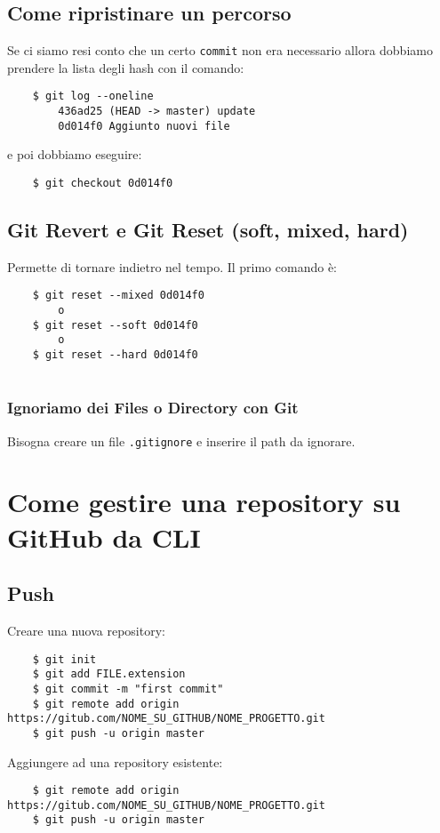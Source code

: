 \documentclass{article}
\begin{document}
\subsection*{Come ripristinare un percorso}
Se ci siamo resi conto che un certo \texttt{commit} non era necessario allora dobbiamo prendere la lista degli hash con il comando:
\begin{verbatim}
    $ git log --oneline
        436ad25 (HEAD -> master) update
        0d014f0 Aggiunto nuovi file
\end{verbatim}
e poi dobbiamo eseguire:
\begin{verbatim}
    $ git checkout 0d014f0
\end{verbatim}

\subsection*{Git Revert e Git Reset (soft, mixed, hard)}
Permette di tornare indietro nel tempo. Il primo comando è:
\begin{verbatim}
    $ git reset --mixed 0d014f0
        o
    $ git reset --soft 0d014f0
        o
    $ git reset --hard 0d014f0
     
\end{verbatim}

\subsubsection*{Ignoriamo dei Files o Directory con Git}
Bisogna creare un file \texttt{.gitignore} e inserire il path da ignorare.

\section*{Come gestire una repository su GitHub da CLI}
\subsection*{Push}
Creare una nuova repository:
\begin{verbatim}
    $ git init
    $ git add FILE.extension
    $ git commit -m "first commit"
    $ git remote add origin https://gitub.com/NOME_SU_GITHUB/NOME_PROGETTO.git
    $ git push -u origin master
\end{verbatim}

Aggiungere ad una repository esistente:
\begin{verbatim}
    $ git remote add origin https://gitub.com/NOME_SU_GITHUB/NOME_PROGETTO.git
    $ git push -u origin master
\end{verbatim}
\end{document}
